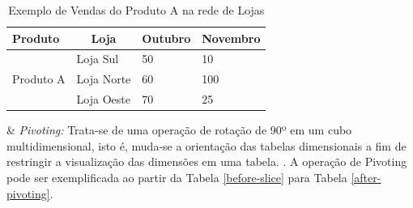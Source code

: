 \begin{table}[ht]
\centering
\begin{tabular}{|c|l|l|l|}
\hline
\multicolumn{1}{|l|}{Produto} & \multicolumn{1}{|c|}{Loja} & Outubro & Novembro \\ \hline
\multirow{3}{*}{Produto A}    & Loja Sul                   & 50      & 10       \\ \cline{2-4} 
\multicolumn{1}{|l|}{}        & Loja Norte                 & 60      & 100      \\ \cline{2-4} 
\multicolumn{1}{|l|}{}        & Loja Oeste                 & 70      & 25       \\ \hline
\end{tabular}
\caption{Exemplo de Vendas do Produto A na rede de Lojas}
\label{after-slice}
\end{table}


\begin{easylist}[itemize]

& \textit{Pivoting:} Trata-se de uma operação de rotação de 90º em um cubo multidimensional, isto é, muda-se a orientação das tabelas dimensionais a fim de restringir a visualização das dimensões em uma tabela. \cite{andre2000}. A operação de Pivoting pode ser exemplificada ao partir da Tabela \ref{before-slice} para Tabela \ref{after-pivoting}.


\end{easylist}




